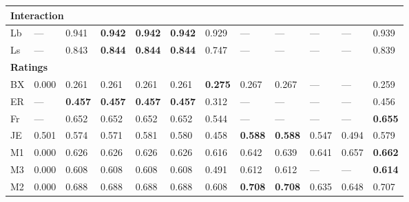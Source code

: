 \begin{longtable}{ llllllllllll }
\hline
\multicolumn{12}{|l|}{\textbf{Interaction}} \\
\hline
\textsf{Lb}                   & --- & 0.941 & \bf{0.942} & \bf{0.942} & \bf{0.942} & 0.929 & --- & --- & --- & --- & 0.939 \\
\textsf{Ls}                   & --- & 0.843 & \bf{0.844} & \bf{0.844} & \bf{0.844} & 0.747 & --- & --- & --- & --- & 0.839 \\

\hline
\multicolumn{12}{|l|}{\textbf{Ratings}} \\
\hline
\textsf{BX}                   & 0.000 & 0.261 & 0.261 & 0.261 & 0.261 & \bf{0.275} & 0.267 & 0.267 & --- & --- & 0.259 \\
\textsf{ER}                   & --- & \bf{0.457} & \bf{0.457} & \bf{0.457} & \bf{0.457} & 0.312 & --- & --- & --- & --- & 0.456 \\
\textsf{Fr}                   & --- & 0.652 & 0.652 & 0.652 & 0.652 & 0.544 & --- & --- & --- & --- & \bf{0.655} \\
\textsf{JE}                   & 0.501 & 0.574 & 0.571 & 0.581 & 0.580 & 0.458 & \bf{0.588} & \bf{0.588} & 0.547 & 0.494 & 0.579 \\
\textsf{M1}                   & 0.000 & 0.626 & 0.626 & 0.626 & 0.626 & 0.616 & 0.642 & 0.639 & 0.641 & 0.657 & \bf{0.662} \\
\textsf{M3}                   & 0.000 & 0.608 & 0.608 & 0.608 & 0.608 & 0.491 & 0.612 & 0.612 & --- & --- & \bf{0.614} \\
\textsf{M2}                   & 0.000 & 0.688 & 0.688 & 0.688 & 0.688 & 0.608 & \bf{0.708} & \bf{0.708} & 0.635 & 0.648 & 0.707 \\

      \hline
    \end{longtable} 

